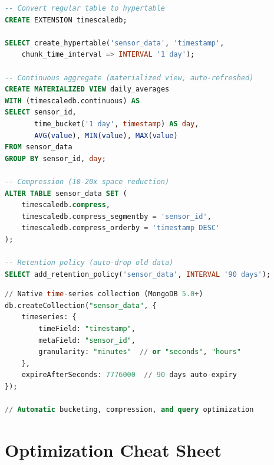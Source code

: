 \documentclass[12pt,a4paper]{article}
\begin{document}
\begin{lstlisting}[language=SQL, caption={TimescaleDB hypertables}]
-- Convert regular table to hypertable
CREATE EXTENSION timescaledb;

SELECT create_hypertable('sensor_data', 'timestamp',
    chunk_time_interval => INTERVAL '1 day');

-- Continuous aggregate (materialized view, auto-refreshed)
CREATE MATERIALIZED VIEW daily_averages
WITH (timescaledb.continuous) AS
SELECT sensor_id,
       time_bucket('1 day', timestamp) AS day,
       AVG(value), MIN(value), MAX(value)
FROM sensor_data
GROUP BY sensor_id, day;

-- Compression (10-20x space reduction)
ALTER TABLE sensor_data SET (
    timescaledb.compress,
    timescaledb.compress_segmentby = 'sensor_id',
    timescaledb.compress_orderby = 'timestamp DESC'
);

-- Retention policy (auto-drop old data)
SELECT add_retention_policy('sensor_data', INTERVAL '90 days');
\end{lstlisting}

\begin{lstlisting}[language=SQL, caption={MongoDB time-series collections}]
// Native time-series collection (MongoDB 5.0+)
db.createCollection("sensor_data", {
    timeseries: {
        timeField: "timestamp",
        metaField: "sensor_id",
        granularity: "minutes"  // or "seconds", "hours"
    },
    expireAfterSeconds: 7776000  // 90 days auto-expiry
});

// Automatic bucketing, compression, and query optimization
\end{lstlisting}


\section{Optimization Cheat Sheet}
\end{document}
